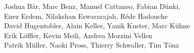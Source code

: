 %
%
%
Joshua Bär,			%
Marc Benz,			%
Manuel Cattaneo,		%
Fabian Dünki,			%
\\
Enez Erdem,			%
Nilakshan Eswararajah,		%
Réde Hadouche%
\\
David Hugentobler,		%
Alain Keller,			%
Yanik Kuster,			%
Marc Kühne%
\\
Erik Löffler,			%
Kevin Meili,			%
Andrea Mozzini Vellen%
\\
Patrik Müller,			%
Naoki Pross,			%
Thierry Schwaller,		%
Tim Tönz			%

